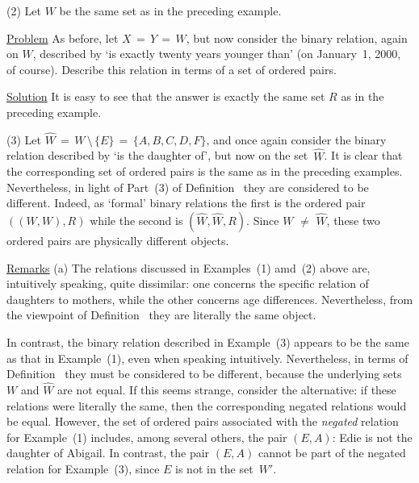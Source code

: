 \V

        (2) Let $W$ be the same set as in the preceding example.

        \underline{Problem} As before, let $X \,=\, Y \,=\, W$, but now consider the binary relation,
    again on $W$, described by `is exactly twenty years younger than' (on January~1, 2000, of course).
    Describe this relation in terms of a set of ordered pairs.

        \underline{Solution} It is easy to see that the answer is exactly the same set $R$ as in the preceding example.

\V

        (3) Let $\hat{W} \,=\, W\,{\setminus}\,\{E\} \,=\, \{A, B, C, D, F\}$, and once again consider the binary relation described by `is the daughter of', but now on the set~$\hat{W}$.
    It is clear that the corresponding set of ordered pairs is the same as in the preceding examples.
    Nevertheless, in light of Part~(3) of Definition~ they are considered to be different.
    Indeed, as `formal' binary relations the first is the ordered pair $((W,W),R)$ while the second is $(\hat{W},\hat{W},R)$.
    Since $W \,\,{\neq}\,\, \hat{W}$, these two ordered pairs are physically different objects.

\V

        \underline{Remarks} (a) The relations discussed in Examples~(1) amd~(2) above are, intuitively speaking, quite dissimilar:
    one concerns the specific relation of daughters to mothers, while the other concerns age differences.
    Nevertheless, from the viewpoint of Definition~ they are literally the same object.

        In contrast, the binary relation described in Example~(3) appears to be the same as that in Example~(1), even when speaking intuitively.
    Nevertheless, in terms of Definition~ they must be considered to be different, because the underlying sets $W$ and $\hat{W}$ are not equal.
    If this seems strange, consider the alternative: if these relations were literally the same, then the corresponding negated relations would be equal.
    However, the set of ordered pairs associated with the {\em negated} relation for Example~(1) includes,
    among several others, the pair $(E,A)$: Edie is not the daughter of Abigail.
    In contrast, the pair $(E,A)$ cannot be part of the negated relation for Example~(3), since $E$ is not in the set~$W'$.


\VV


